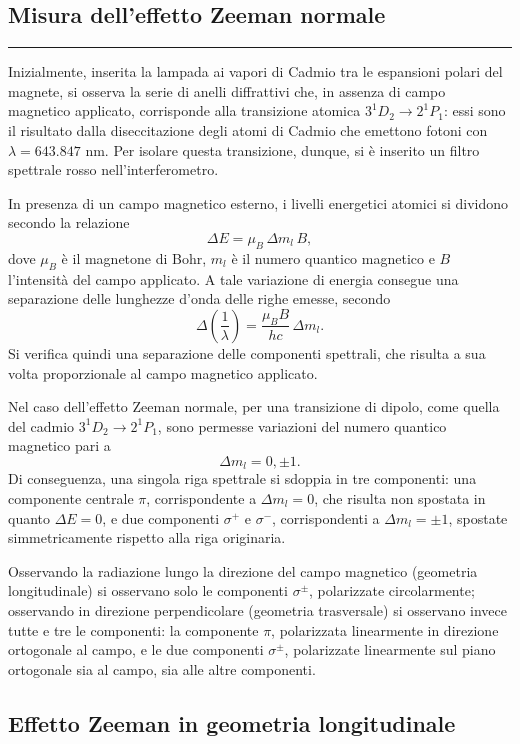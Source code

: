\newpage
\begin{center}
\section{Misura dell’effetto Zeeman normale}
\end{center}
\medskip
{\color{gray}\hrule}
\medskip
Inizialmente, inserita la lampada ai vapori di Cadmio tra le espansioni polari del magnete, si osserva la serie di anelli diffrattivi che, in assenza di campo magnetico applicato, corrisponde alla transizione atomica $3^1D_2 \rightarrow 2^1P_1$: essi sono il risultato dalla diseccitazione degli atomi di Cadmio che emettono fotoni con $\lambda=643.847$ nm. Per isolare questa transizione, dunque, si è inserito un filtro spettrale rosso nell'interferometro. 

In presenza di un campo magnetico esterno, i livelli energetici atomici si dividono secondo la relazione
\[
\Delta E = \mu_B \, \Delta m_l \, B ,
\]
dove $\mu_B$ è il magnetone di Bohr, $m_l$ è il numero quantico magnetico e $B$ l’intensità del campo applicato. A tale variazione di energia consegue una separazione delle lunghezze d’onda delle righe emesse, secondo 
\[
\Delta\!\left(\frac{1}{\lambda}\right) = \frac{\mu_B B}{hc}\,\Delta m_l .
\]
Si verifica quindi una separazione delle componenti spettrali, che risulta a sua volta proporzionale al campo magnetico applicato.

Nel caso dell’effetto Zeeman normale, per una transizione di dipolo, come quella del cadmio $3^1D_2 \rightarrow 2^1P_1$, sono permesse variazioni del numero quantico magnetico pari a
\[
\Delta m_l = 0, \pm 1 .
\]
Di conseguenza, una singola riga spettrale si sdoppia in tre componenti: una componente centrale $\pi$, corrispondente a $\Delta m_l = 0$, che risulta non spostata in quanto $\Delta E=0$, e due componenti $\sigma^{+}$ e $\sigma^{-}$, corrispondenti a $\Delta m_l = \pm 1$, spostate simmetricamente rispetto alla riga originaria. 

Osservando la radiazione lungo la direzione del campo magnetico (geometria longitudinale) si osservano solo le componenti $\sigma^{\pm}$, polarizzate circolarmente; osservando in direzione perpendicolare (geometria trasversale) si osservano invece tutte e tre le componenti: la componente $\pi$, polarizzata linearmente in direzione ortogonale al campo, e le due componenti $\sigma^{\pm}$, polarizzate linearmente sul piano ortogonale sia al campo, sia alle altre componenti.

\subsection{Effetto Zeeman in geometria longitudinale}

